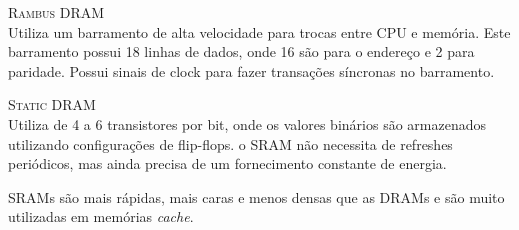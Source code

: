\textsc{Rambus DRAM}\\
Utiliza um barramento de alta velocidade para trocas entre CPU e memória. Este barramento possui 18 linhas de dados, onde 16 são para o endereço e 2 para paridade. Possui sinais de clock para fazer transações síncronas no barramento.

\textsc{Static DRAM}\\
Utiliza de 4 a 6 transistores por bit, onde os valores binários são armazenados utilizando configurações de flip-flops. o SRAM não necessita de refreshes periódicos, mas ainda precisa de um fornecimento constante de energia.

SRAMs são mais rápidas, mais caras e menos densas que as DRAMs e são muito utilizadas em memórias \textit{cache}.
